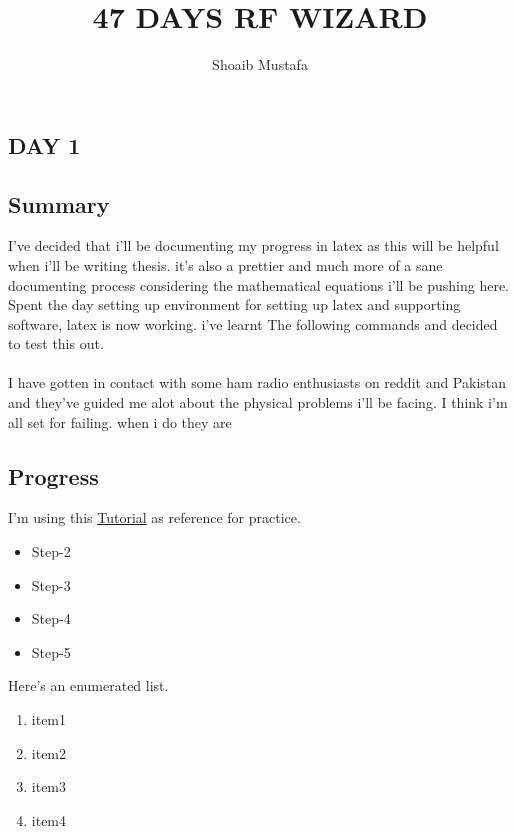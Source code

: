\documentclass[12pt]{article}
\title{47 DAYS RF WIZARD}
\author{Shoaib Mustafa}
\begin{document}
\maketitle

\begin{center}
    \section*{DAY 1}
\end{center}
\subsection*{Summary}

I've decided that i'll be documenting my progress in latex as this
will be helpful when i'll be writing thesis. it's also a prettier 
and much more of a sane documenting process considering the mathematical
equations i'll be pushing here. Spent the day setting up environment for setting up latex and 
supporting software, latex is now working. i've learnt The
following commands and decided to test this out. \\
\\
I have gotten in contact with some ham radio enthusiasts on reddit
and Pakistan and they've guided me alot about the physical problems
i'll be facing. I think i'm all set for failing. when i do they are
\\  %
\subsection*{Progress}
I'm using this \underline{\href{https://www.cs.princeton.edu/courses/archive/spr10/cos433/Latex/latex-guide.pdf}{Tutorial}}
as reference for practice.
\label{lists} %
\begin{itemize}
    \item Step-2
    \item Step-3
    \item Step-4
    \item Step-5
\end{itemize}
Here's an enumerated list.
\begin{enumerate}
    \item item1 
    \item item2
    \item item3
    \item item4
\end{enumerate}
\end{document}
